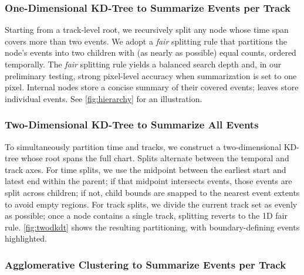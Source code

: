 \begin{refsection}

\subsubsection{One-Dimensional KD-Tree to Summarize Events per Track}

Starting from a track-level root, we recursively split any node whose time span covers more than two events. We adopt a \emph{fair} splitting rule that partitions the node's events into two children with (as nearly as possible) equal counts, ordered temporally. The \emph{fair} splitting rule yields a balanced search depth and, in our preliminary testing, strong pixel-level accuracy when summarization is set to one pixel. Internal nodes store a concise summary of their covered events; leaves store individual events. See \autoref{fig:hierarchy} for an illustration.

\subsubsection{Two-Dimensional KD-Tree to Summarize All Events}
To simultaneously partition time and tracks, we construct a two-dimensional KD-tree whose root spans the full chart. Splits alternate between the temporal and track axes. For time splits, we use the midpoint between the earliest start and latest end within the parent; if that midpoint intersects events, those events are split across children; if not, child bounds are snapped to the nearest event extents to avoid empty regions. For track splits, we divide the current track set as evenly as possible; once a node contains a single track, splitting reverts to the 1D fair rule. \autoref{fig:twodkdt} shows the resulting partitioning, with boundary-defining events highlighted.

\subsubsection{Agglomerative Clustering to Summarize Events per Track}


\end{refsection}
